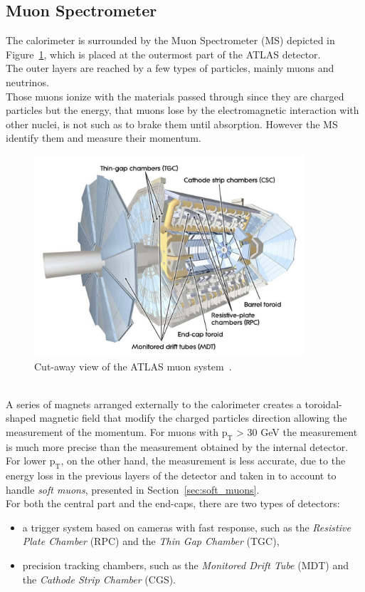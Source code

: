 \FloatBarrier
\subsection{Muon Spectrometer}
\label{sec:MuonSpec}
The calorimeter is surrounded by the Muon Spectrometer (MS) depicted in Figure~\ref{fig:MS}, which is placed at the outermost part of the ATLAS detector.\\
The outer layers are reached by a few types of particles, mainly muons and neutrinos.\\
Those muons ionize  with the materials passed through since they are charged particles but the energy, that muons lose by the electromagnetic interaction
with other nuclei, is not such as to brake them until absorption. 
However the MS  identify them and measure their momentum.
\begin{figure}[h]
	\centering
	\includegraphics[width=10cm]{Chapters/CH2/figures/MS}
	\caption{Cut-away view of the ATLAS muon system~\cite{ATLAS}.}
	\label{fig:MS}
\end{figure}
\\A series of magnets arranged externally to the calorimeter creates a toroidal-shaped magnetic field
that modify the charged particles direction allowing the measurement of the momentum.
For muons with $\mathrm{p_T}$ > 30 GeV the measurement is much more precise than the measurement obtained by the internal detector. 
For lower $\mathrm{p_T}$, on the other hand, the measurement is less accurate, due to the 
energy loss in the previous layers of the detector and taken in to account to handle \textit{soft muons}, presented in Section~\ref{sec:soft_muons}.\\
For both the central part and the end-caps,  there are two types of detectors:
\begin{itemize}
	\item a trigger system based on cameras with fast response, such as the \textit{Resistive Plate Chamber} (RPC) and the \textit{Thin Gap Chamber} (TGC), 
	\item precision tracking chambers, such as the \textit{Monitored Drift Tube} (MDT) and the \textit{Cathode Strip Chamber} (CGS).
\end{itemize}

